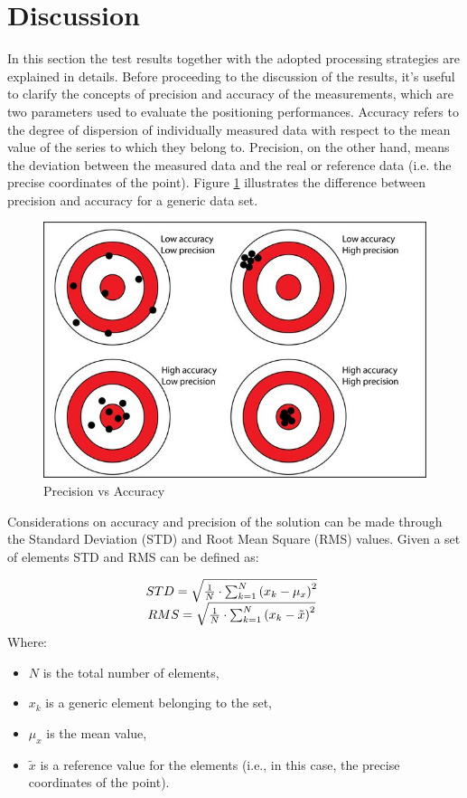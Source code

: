 \section{Discussion}
In this section the test results together with the adopted processing strategies are explained in details. Before proceeding to the discussion of the results, it's useful to clarify the concepts of precision and accuracy of the measurements, which are two parameters used to evaluate the positioning performances. Accuracy refers to the degree of dispersion of individually measured data with respect to the mean value of the series to which they belong to. Precision, on the other hand, means the deviation between the measured data and the real or reference data (i.e. the precise coordinates of the point). Figure \ref{FIG:prec_vs_acc} illustrates the difference between precision and accuracy for a generic data set.

\begin{figure}[H] 
	\centering
	\includegraphics[scale=0.4]{fig/Precision-versus-accuracy.jpg} 
	\caption{Precision vs Accuracy}
	\label{FIG:prec_vs_acc} 
\end{figure}

Considerations on accuracy and precision of the solution can be made through the Standard Deviation (STD) and Root Mean Square (RMS) values. Given a set of elements STD and RMS can be defined as:

\begin{equation} 
	\begin{matrix} 
		STD= \sqrt{\frac{1}{N}\cdot \sum_{k=1}^N \left(x_{k}-\mu_{x}\right)^2 }\\ 
		RMS= \sqrt{\frac{1}{N}\cdot \sum_{k=1}^N \left(x_{k}-\tilde{x} \right)^2 }
		\end{matrix}
	\\
	\label{eq:std-rms}
\end{equation}
Where:
\begin{itemize}
\item $N$ is the total number of elements,
\item $x_{k}$ is a generic element belonging to the set,
\item $\mu_{x}$ is the mean value,
\item $\tilde{x}$ is a reference value for the elements (i.e., in this case, the precise coordinates of the point).
\end{itemize}

